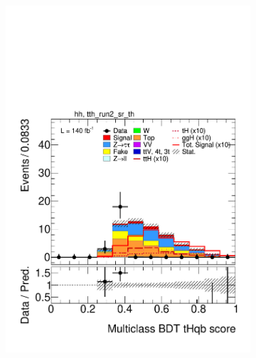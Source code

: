 \begin{figure}[htbp]
  \centering
  \begin{subfigure}[b]{0.49\textwidth}
    \centering
    \includegraphics[width=\textwidth]{images/plots_modelling_run2_run3_variables/run_2_tth/plot_tth_th_multiclass_th_hh_tth_run2_sr_th_15_16_17_18.pdf}
    \caption{}


\end{subfigure}
\end{figure}
